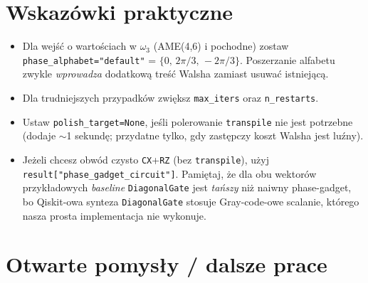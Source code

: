 \documentclass[11pt,a4paper]{article}
\newcommand{\1}{\mathbf{1}}
\newcommand{\w}{\omega}
\newcommand{\code}[1]{\texttt{#1}}
\begin{document}
\section{Wskazówki praktyczne}
\label{sec:tips}

\begin{itemize}[leftmargin=*]
  \item Dla wejść o wartościach w $\w_{3}$ (AME(4,6) i pochodne) zostaw
        \code{phase\_alphabet="default"} = $\{0,\,2\pi/3,\,-2\pi/3\}$.
        Poszerzanie alfabetu zwykle \emph{wprowadza} dodatkową treść
        Walsha zamiast usuwać istniejącą.
  \item Dla trudniejszych przypadków zwiększ \code{max\_iters} oraz
        \code{n\_restarts}.
  \item Ustaw \code{polish\_target=None}, jeśli polerowanie
        \code{transpile} nie jest potrzebne (dodaje $\sim$1 sekundę;
        przydatne tylko, gdy zastępczy koszt Walsha jest luźny).
  \item Jeżeli chcesz obwód czysto \code{CX}+\code{RZ} (bez
        \code{transpile}), użyj \code{result["phase\_gadget\_circuit"]}.
        Pamiętaj, że dla obu wektorów przykładowych \emph{baseline}
        \code{DiagonalGate} jest \emph{tańszy} niż naiwny phase-gadget,
        bo Qiskit-owa synteza \code{DiagonalGate} stosuje
        Gray-code-owe scalanie, którego nasza prosta implementacja nie
        wykonuje.
\end{itemize}

\section{Otwarte pomysły / dalsze prace}
\label{sec:future}
\end{document}
